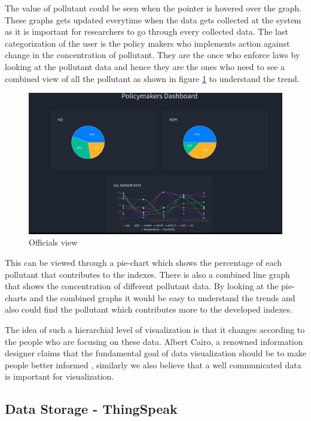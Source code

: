 The value of pollutant could be seen when the pointer is hovered over the graph. These graphs gets updated everytime when the data gets collected at the system as it is important for researchers to go through every collected data. The last categorization of the user is the policy makers who implements action against change in the concentration of pollutant. They are the once who enforce laws by looking at the pollutant data and hence they are the ones who need to see a combined view of all the pollutant as shown in figure \ref{view3} to understand the trend.

\begin{figure}[h]
  \begin{center}
  \includegraphics[scale=0.45]{./images/figure16.png}
  \end{center}
  \caption{Officials view}
  \label{view3}
\end{figure}

This can be viewed through a pie-chart which shows the percentage of each pollutant that contributes to the indexes.  There is also a combined line graph that shows the concentration of different pollutant data. By looking at the pie-charts and the combined graphs it would be easy to understand the trends and also could find the pollutant which contributes more to the developed indexes. 

The idea of such a hierarchial level of visualization is that it changes according to the people who are focusing on these data. Albert Cairo, a renowned information designer claims that the fundamental goal of data visualization should be to make people better informed \cite{Hepworth} \cite{Cairo2014},  similarly we also believe that a well communicated data is important for visualization.


\subsection{Data Storage - ThingSpeak}

